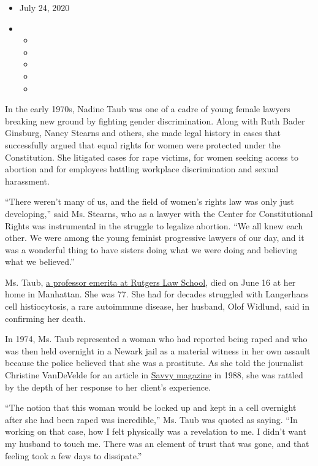 \begin{itemize}
\item
  July 24, 2020
\item
  \begin{itemize}
  \item
  \item
  \item
  \item
  \item
  \end{itemize}
\end{itemize}

In the early 1970s, Nadine Taub was one of a cadre of young female
lawyers breaking new ground by fighting gender discrimination. Along
with Ruth Bader Ginsburg, Nancy Stearns and others, she made legal
history in cases that successfully argued that equal rights for women
were protected under the Constitution. She litigated cases for rape
victims, for women seeking access to abortion and for employees battling
workplace discrimination and sexual harassment.

``There weren't many of us, and the field of women's rights law was only
just developing,'' said Ms. Stearns, who as a lawyer with the Center for
Constitutional Rights was instrumental in the struggle to legalize
abortion. ``We all knew each other. We were among the young feminist
progressive lawyers of our day, and it was a wonderful thing to have
sisters doing what we were doing and believing what we believed.''

Ms. Taub,
\href{https://law.rutgers.edu/news/professor-emerita-nadine-taub-77-dies-after-long-illness}{a
professor emerita at Rutgers Law School}, died on June 16 at her home in
Manhattan. She was 77. She had for decades struggled with Langerhans
cell histiocytosis, a rare autoimmune disease, her husband, Olof
Widlund, said in confirming her death.

In 1974, Ms. Taub represented a woman who had reported being raped and
who was then held overnight in a Newark jail as a material witness in
her own assault because the police believed that she was a prostitute.
As she told the journalist Christine VanDeVelde for an article in
\href{https://www.nytimes3xbfgragh.onion/2013/09/05/business/media/judith-daniels-74-editor-of-savvy-magazine-dies.html}{Savvy
magazine} in 1988, she was rattled by the depth of her response to her
client's experience.

``The notion that this woman would be locked up and kept in a cell
overnight after she had been raped was incredible,'' Ms. Taub was quoted
as saying. ``In working on that case, how I felt physically was a
revelation to me. I didn't want my husband to touch me. There was an
element of trust that was gone, and that feeling took a few days to
dissipate.''


